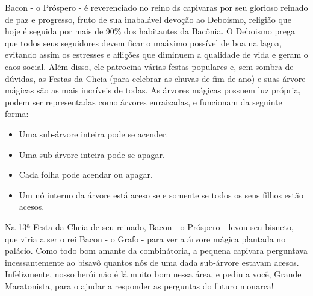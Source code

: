 %

Bacon - o Próspero - é reverenciado no reino ds capivaras por seu glorioso reinado de paz e progresso, fruto de sua inabalável devoção ao Deboismo,
religião que hoje é seguida por mais de 90\% dos habitantes da Bacônia. O Deboismo prega que todos seus seguidores devem ficar o maáximo possível
de boa na lagoa, evitando assim os estresses e aflições que diminuem a qualidade de vida e geram o caos social. Além disso, ele patrocina várias festas
populares e, sem sombra de dúvidas, as Festas da Cheia (para celebrar as chuvas de fim de ano) e suas árvore mágicas são as mais incríveis de todas.
As árvores mágicas possuem luz própria, podem ser representadas como árvores enraizadas, e funcionam da seguinte forma:

\begin{itemize}
	\item Uma sub-árvore inteira pode se acender.
	\item Uma sub-árvore inteira pode se apagar.
	\item Cada folha pode acendar ou apagar.
	\item Um nó interno da árvore está aceso se e somente se todos os seus filhos estão acesos.
\end{itemize}

Na 13ª Festa da Cheia de seu reinado, Bacon - o Próspero - levou seu bisneto, que viria a ser o rei Bacon - o Grafo - para ver a árvore mágica plantada
no palácio. Como todo bom amante da combinátoria, a pequena capivara perguntava incessantemente ao bisavô quantos nós de uma dada sub-árvore estavam acesos.
Infelizmente,  nosso herói não é lá muito bom nessa área, e pediu a você, Grande Maratonista, para o ajudar a responder as perguntas do futuro monarca!

%
%


